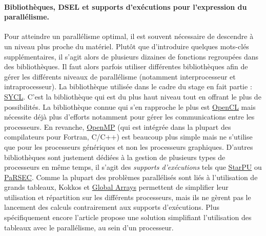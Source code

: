 \paragraph{Bibliothèques, DSEL et supports d'exécutions pour l'expression du parallélisme.}
Pour atteindre un parallélisme optimal, il est souvent nécessaire de descendre à un niveau plus proche du matériel. Plutôt que d'introduire quelques mots-clés supplémentaires, il s'agit alors de plusieurs dizaines de fonctions regroupées dans des bibliothèques. Il faut alors parfois utiliser différentes bibliothèques afin de gérer les différents niveaux de parallélisme (notamment interprocesseur et intraprocesseur). La bibliothèque utilisée dans le cadre du stage en fait partie : \textsf{\href{https://www.khronos.org/sycl}{SYCL}}. C'est la bibliothèque qui est du plus haut niveau tout en offrant le plus de possibilités. La bibliothèque connue qui s'en rapproche le plus est \textsf{\href{https://www.khronos.org/opencl/}{OpenCL}} mais nécessite déjà plus d'efforts notamment pour gérer les communications entre les processeurs. En revanche, \textsf{\href{http://openmp.org/wp/}{OpenMP}} (qui est intégrée dans la plupart des compilateurs pour \textsf{Fortran}, \textsf{C/C++}) est beaucoup plus simple mais ne s'utilise que pour les processeurs génériques et non les processeurs graphiques. D'autres bibliothèques sont justement dédiées à la gestion de plusieurs types de processeurs en même temps, il s'agit des \emph{supports d'exécutions} tels que \textsf{\href{http://starpu.gforge.inria.fr/}{StarPU}} ou \textsf{\href{http://icl.utk.edu/parsec/}{PaRSEC}}. Comme la plupart des problèmes parallélisés sont liés à l'utilisation de grands tableaux, \textsf{Kokkos} \cite{Web5} et \textsf{\href{http://hpc.pnl.gov/globalarrays/}{Global Arrays}} permettent de simplifier leur utilisation et répartition sur les différents processeurs, mais ils ne gèrent pas le lancement des calculs contrairement aux supports d'exécutions. Plus spécifiquement encore l'article \cite{Art2} propose une solution simplifiant l'utilisation des tableaux avec le parallélisme, au sein d'un processeur. 


